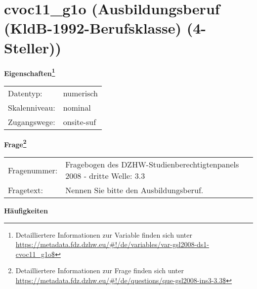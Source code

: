 
    \setcounter{footnote}{0}

    \vspace*{-1.8cm}
	\section{cvoc11\_g1o (Ausbildungsberuf (KldB-1992-Berufsklasse) (4-Steller))}
	\label{section:cvoc11_g1o}



    \vspace*{0.5cm}
    \noindent\textbf{Eigenschaften\footnote{Detailliertere Informationen zur Variable finden sich unter
		\url{https://metadata.fdz.dzhw.eu/\#!/de/variables/var-gsl2008-ds1-cvoc11_g1o$}}}\\
	\begin{tabularx}{\hsize}{@{}lX}
	Datentyp: & numerisch \\
	Skalenniveau: & nominal \\
	Zugangswege: &
	  onsite-suf
 \\
    \end{tabularx}



				\vspace*{0.5cm}
                \noindent\textbf{Frage\footnote{Detailliertere Informationen zur Frage finden sich unter
		              \url{https://metadata.fdz.dzhw.eu/\#!/de/questions/que-gsl2008-ins3-3.3$}}}\\
				\begin{tabularx}{\hsize}{@{}lX}
					Fragenummer: &
					  Fragebogen des DZHW-Studienberechtigtenpanels 2008 - dritte Welle:
					  3.3
 \\
					Fragetext: & Nennen Sie bitte den Ausbildungsberuf. \\
				\end{tabularx}





        		\vspace*{0.5cm}
                \noindent\textbf{Häufigkeiten}


